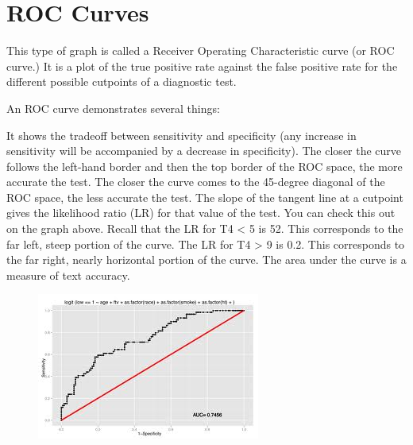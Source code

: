 \documentclass[caret-main.tex]{subfiles}
\begin{document}
\section{ROC Curves}


This type of graph is called a Receiver Operating Characteristic curve (or ROC curve.) It is a plot of the true positive rate against the false positive rate for the different possible cutpoints of a diagnostic test.

An ROC curve demonstrates several things:

It shows the tradeoff between sensitivity and specificity (any increase in sensitivity will be accompanied by a decrease in specificity).
The closer the curve follows the left-hand border and then the top border of the ROC space, the more accurate the test.
The closer the curve comes to the 45-degree diagonal of the ROC space, the less accurate the test.
The slope of the tangent line at a cutpoint gives the likelihood ratio (LR) for that value of the test. You can check this out on the graph above. Recall that the LR for T4 < 5 is 52. This corresponds to the far left, steep portion of the curve. The LR for T4 > 9 is 0.2. This corresponds to the far right, nearly horizontal portion of the curve.
The area under the curve is a measure of text accuracy.

\newpage
\begin{figure}
\centering
\includegraphics[width=0.7\linewidth]{./ROCcurve}
\caption{}
\label{fig:ROCcurve}
\end{figure}

\end{document}
